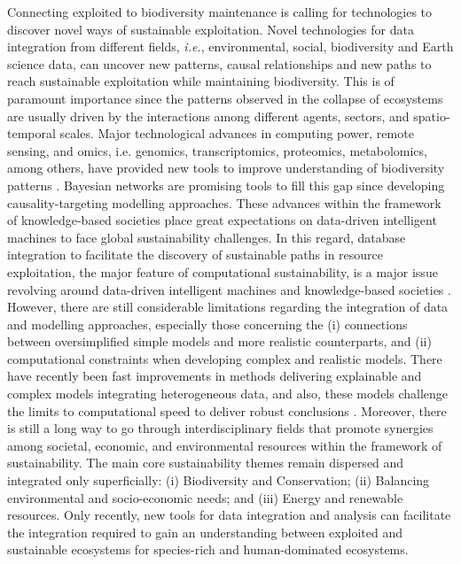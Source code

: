\documentclass[12pt,a4paper]{article}
\begin{document}
Connecting exploited to biodiversity maintenance is calling for technologies to discover novel ways of sustainable exploitation. Novel technologies for data integration from different fields, {\it i.e.}, environmental, social, biodiversity and Earth science data, can uncover new patterns, causal relationships and new paths to reach sustainable exploitation while maintaining biodiversity. This is of paramount importance since the patterns observed in the collapse of ecosystems are usually driven by the interactions among different agents, sectors, and spatio-temporal scales. Major technological advances in computing power, remote sensing, and omics, i.e. genomics, transcriptomics, proteomics, metabolomics, among others, have provided new tools to improve understanding of biodiversity patterns \citep{craven2019evolution}. Bayesian networks are promising tools to fill this gap since developing causality-targeting modelling approaches.
These advances within the framework of knowledge-based societies place great expectations on data-driven intelligent machines to face global sustainability challenges. In this regard, database integration to facilitate the discovery of sustainable paths in resource exploitation, the major feature of computational sustainability, is a major issue revolving around data-driven intelligent machines and knowledge-based societies \citep{Gomesetal2019}. However, there are still considerable limitations regarding the integration of data and modelling approaches, especially those concerning the (i) connections between oversimplified simple models and more realistic counterparts, and (ii) computational constraints when developing complex and realistic models. There have recently been fast improvements in methods delivering explainable and complex models integrating heterogeneous data, and also, these models challenge the limits to computational speed to deliver robust conclusions \citep{rodrigues2014integrative}. Moreover, there is still a long way to go through interdisciplinary fields that promote synergies among societal, economic, and environmental resources within the framework of sustainability. The main core sustainability themes remain dispersed and integrated only superficially: (i) Biodiversity and Conservation; (ii) Balancing environmental and socio-economic needs; and (iii) Energy and renewable resources. Only recently, new tools for data integration and analysis can facilitate the integration required to gain an understanding between exploited and sustainable ecosystems for species-rich and human-dominated ecosystems.
\end{document}
